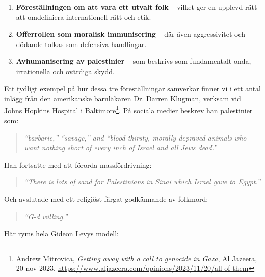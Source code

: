 \documentclass[12pt]{article}
\begin{document}
\begin{enumerate}
    \item \textbf{Föreställningen om att vara ett utvalt folk} – vilket ger en upplevd rätt att omdefiniera internationell rätt och etik.
    \item \textbf{Offerrollen som moralisk immunisering} – där även aggressivitet och dödande tolkas som defensiva handlingar.
    \item \textbf{Avhumanisering av palestinier} – som beskrivs som fundamentalt onda, irrationella och ovärdiga skydd.
\end{enumerate}

Ett tydligt exempel på hur dessa tre föreställningar samverkar finner vi i ett antal inlägg från den amerikanske barnläkaren Dr. Darren Klugman, verksam vid Johns Hopkins Hospital i Baltimore\footnote{Andrew Mitrovica, \textit{Getting away with a call to genocide in Gaza}, Al Jazeera, 20 nov 2023. \url{https://www.aljazeera.com/opinions/2023/11/20/all-of-them}}. På sociala medier beskrev han palestinier som:

\begin{quote}
\textit{“barbaric,” “savage,” and “blood thirsty, morally depraved animals who want nothing short of every inch of Israel and all Jews dead.”}
\end{quote}

Han fortsatte med att förorda massfördrivning:
\begin{quote}
\textit{“There is lots of sand for Palestinians in Sinai which Israel gave to Egypt.”}
\end{quote}

Och avslutade med ett religiöst färgat godkännande av folkmord:
\begin{quote}
\textit{“G-d willing.”}
\end{quote}

Här ryms hela Gideon Levys modell:
\end{document}
